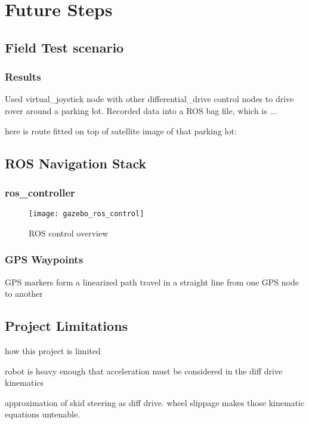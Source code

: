 \chapter{Future Steps}

\section{Field Test scenario}

\subsection{Results}

Used virtual\_joystick node with other differential\_drive control nodes to drive rover around a parking lot. Recorded data into a ROS bag file, which is ...

here is route fitted on top of satellite image of that parking lot:

\section{ROS Navigation Stack}

\subsection{ros\_controller}
\begin{figure}[h]
	\caption{ROS control overview \cite{fig_ros_control}}
	\texttt{[image: gazebo\_ros\_control]}
	\label{fig:ros_controller}
\end{figure}



\subsection{GPS Waypoints}
GPS markers form a linearized path
travel in a straight line from one GPS node to another


\section{Project Limitations}
how this project is limited

robot is heavy enough that acceleration must be considered in the diff drive kinematics

approximation of skid steering as diff drive. wheel slippage makes those kinematic equations untenable.

